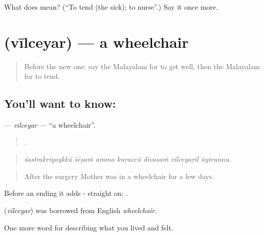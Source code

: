 \begin{tcolorbox}[breakable,colback=teal!4,colframe=teal!35!black,title={Before you move on}]
What does  mean? (\textquotedblleft{}To tend (the sick); to nurse\textquotedblright{}.) Say it once more.
\end{tcolorbox}
\section[\texorpdfstring{\ml{വീൽചെയർ} (vīlceyar)}{വീൽചെയർ (vīlceyar)}]{ (vīlceyar) — a wheelchair}

\label{lesson:ML-C538-vilceyar}



\begin{quote}
Before the new one: say the Malayalam for to get well, then the Malayalam for to tend.
\end{quote}

\subsection*{You'll want to know: }
\textbf{} — \emph{vīlceyar} — \textquotedblleft{}a wheelchair\textquotedblright{}.

\begin{quote}
      .
\end{quote}

\begin{quote}
\emph{śastrakriyaykkŭ śēṣaṁ amma kuṟaccŭ divasaṁ vīlceyaṟil āyirunnu.}
\end{quote}

\begin{quote}
After the surgery Mother was in a wheelchair for a few days.
\end{quote}

Before an ending it adds - straight on: .

\begin{cousinweb}
\textbf{} (\emph{vīlceyar}) was borrowed from English \emph{wheelchair}.
\end{cousinweb}

\begin{grammarlens}[title={What you've built}]
One more word for describing what you lived and felt.
\end{grammarlens}

